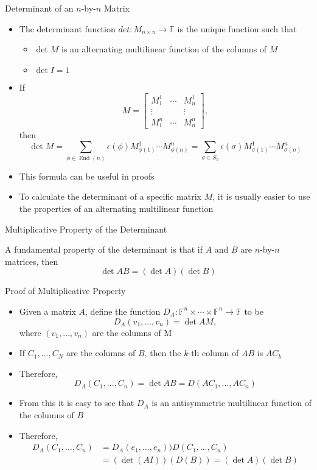 \documentclass[usenames,dvipsnames,10pt]{beamer}
\newcommand\F{\mathbb{F}}
\newcommand{\End}{\operatorname{End}}
\begin{document}
\begin{frame}
  {Determinant of an $n$-by-$n$ Matrix}

  \begin{itemize}
  \item The determinant function $det: M_{n\times n} \rightarrow \F$ is the unique function such that
    \begin{itemize}
    \item $\det M$ is an alternating multilinear function of the columns of $M$
    \item $\det I = 1$
    \end{itemize}
  \item If
    \[
      M = \begin{bmatrix} M^1_1 & \cdots & M^1_n \\ \vdots & & \vdots \\ M^n_1 & \cdots & M^n_n \end{bmatrix},\]
    then
    \[
      \det M = \sum_{\phi\in\End(n)}\epsilon(\phi)M^1_{\phi(1)}\cdots M^n_{\phi(n)} = \sum_{\sigma\in S_n}\epsilon(\sigma)M^1_{\sigma(1)}\cdots M^n_{\sigma(n)}
    \]
  \item This formula can be useful in proofs
  \item To calculate the determinant of a specific matrix $M$, it is usually easier to use the properties of an alternating multilinear function
  \end{itemize}
\end{frame}

\begin{frame}
  {Multiplicative Property of the Determinant}

  A fundamental property of the determinant is that if $A$ and $B$ are $n$-by-$n$ matrices, then
  \[
    \det AB = (\det A)(\det B)
  \]
\end{frame}

\begin{frame}
  {Proof of Multiplicative Property}
  
  \begin{itemize}
  \item Given a matrix $A$, define the function $D_A: \F^n\times\cdots\times\F^n \rightarrow \F$ to be
    \[
      D_A(v_1, \dots, v_n) = \det AM,
    \]
    where $(v_1, \dots, v_n)$ are the columns of M
  \item If $C_1, \dots, C_N$ are the columns of $B$, then the $k$-th column of $AB$ is $AC_k$
  \item Therefore,
    \[
      D_A(C_1, \dots, C_n) = \det AB = D(AC_1, \dots, AC_n)
    \]
  \item From this it is easy to see that $D_A$ is an antisymmetric multilinear function of the columns of $B$
  \item Therefore,
    \begin{align*}
      D_A(C_1, \dots, C_n) &= D_A(e_1, \dots, e_n))D(C_1, \dots, C_n)\\
                           &= (\det (AI) )(D(B)) = (\det A)(\det B)
    \end{align*}
  \end{itemize}
\end{frame}
\end{document}
